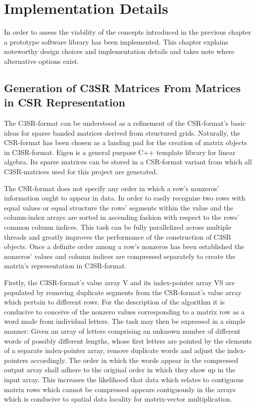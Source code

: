 \chapter{Implementation Details}

  In order to assess the viability of the concepts introduced in the previous chapter a prototype software library has
  been implemented. This chapter explains noteworthy design choices and implementation details and takes note where
  alternative options exist.

  \section{Generation of C3SR Matrices From Matrices in CSR Representation} \label{sec:gen-of-c3sr-from-csr}

    The C3SR-format can be understood as a refinement of the CSR-format's basic ideas for sparse banded matrices derived
    from structured grids. Naturally, the CSR-format has been chosen as a landing pad for the creation of matrix objects
    in C3SR-format. Eigen \cite{eigen:website} is a general purpose C++ template library for linear algebra. Its sparse
    matrices can be stored in a CSR-format variant from which all C3SR-matrices used for this project are generated.

    The CSR-format does not specify any order in which a row's nonzeros' information ought to appear in data. In order
    to easily recognize two rows with equal values or equal structure the rows' segments within the value and the
    column-index arrays are sorted in ascending fashion with respect to the rows' common column indices. This task can
    be fully parallelized across multiple threads and greatly improves the performance of the construction of C3SR
    objects. Once a definite order among a row's nonzeros has been established the nonzeros' values and column indices
    are compressed separately to create the matrix's representation in C3SR-format.

    Firstly, the C3SR-format's value array V and its index-pointer array VS are populated by removing duplicate segments
    from the CSR-format's value array which pertain to different rows. For the description of the algorithm it is
    conducive to conceive of the nonzero values corresponding to a matrix row as a word made from individual letters.
    The task may then be expressed in a simple manner: Given an array of letters comprising an unknown number of
    different words of possibly different lengths, whose first letters are pointed by the elements of a separate
    index-pointer array, remove duplicate words and adjust the index-pointers accordingly. The order in which the words
    appear in the compressed output array shall adhere to the original order in which they show up in the input array.
    This increases the likelihood that data which relates to contiguous matrix rows which cannot be compressed appears
    contiguously in the arrays which is conducive to spatial data locality for matrix-vector multiplication.

